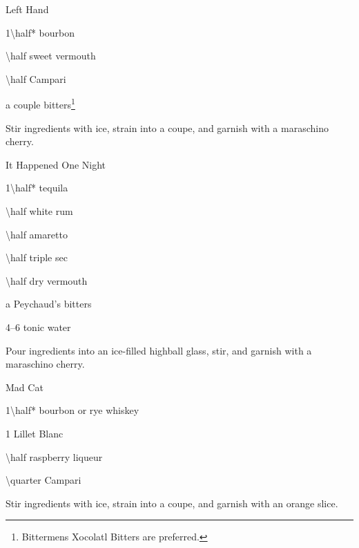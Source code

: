 \begin{Cocktail}{Left Hand}
	\begin{Ingredients}
	\item \SI{1\half*}{\oz} bourbon
	\item \SI{\half}{\oz} sweet vermouth
	\item \SI{\half}{\oz} Campari
	\item a couple \si{\dashes} bitters\footnote{Bittermens Xocolatl Bitters are preferred.}
	\end{Ingredients}
	
	\begin{Instructions}
	Stir ingredients with ice, strain into a coupe, and garnish with a maraschino cherry.
	\end{Instructions}
\end{Cocktail}

\begin{Cocktail*}{It Happened One Night}
	\begin{Ingredients}\normalsize
	\item \SI{1\half*}{\oz} tequila
	\item \SI{\half}{\oz} white rum
	\item \SI{\half}{\oz} amaretto
	\item \SI{\half}{\oz} triple sec
	\item \SI{\half}{\oz} dry vermouth
	\item a \si{\dash} Peychaud's bitters
	\item \SIrange{4}{6}{\oz} tonic water
	\end{Ingredients}
	
	\begin{Instructions}
	Pour ingredients into an ice-filled highball glass, stir, and garnish with a maraschino cherry.
	\end{Instructions}
\end{Cocktail*}

%	
%	

\begin{Cocktail*}{Mad Cat}
	\begin{Ingredients}
	\item \SI{1\half*}{\oz} bourbon or rye whiskey
	\item \SI{1}{\oz} Lillet Blanc\footnotemark[2]\footnotetext[2]{\LilletFootnoteText}
	\item \SI{\half}{\oz} raspberry liqueur
	\item \SI{\quarter}{\oz} Campari
	\end{Ingredients}
	
	\begin{Instructions}
	Stir ingredients with ice, strain into a coupe, and garnish with an orange slice.
	\end{Instructions}
\end{Cocktail*}

